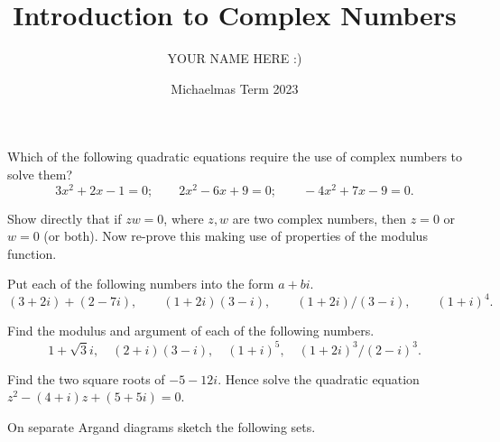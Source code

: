 \documentclass[answers]{exam}
\title{Introduction to Complex Numbers}
\author{YOUR NAME HERE :)}
\date{Michaelmas Term 2023}
\begin{document}
\maketitle
\begin{questions}

\question%
Which of the following quadratic equations require the use of complex numbers to solve them? \[
	3 x^{2}+2 x-1=0 ; \qquad 2 x^{2}-6 x+9=0 ; \qquad-4 x^{2}+7 x-9=0.
\]



\question%
Show directly that if $z w=0$, where $z, w$ are two complex numbers, then $z=0$ or $w=0$ (or both). Now re-prove this making use of properties of the modulus function.



\question%
Put each of the following numbers into the form $a+b i$. \[
	(3+2 i)+(2-7 i), \qquad(1+2 i)(3-i), \qquad(1+2 i) /(3-i), \qquad(1+i)^{4}.
\]



\question%
Find the modulus and argument of each of the following numbers. \[
	1+\sqrt{3} i, \quad(2+i)(3-i), \quad(1+i)^{5}, \quad(1+2 i)^{3} /(2-i)^{3}.
\]



\question%
Find the two square roots of $-5-12 i$. Hence solve the quadratic equation $z^{2}-(4+i) z+(5+5 i)=0$.



\question%
On separate Argand diagrams sketch the following sets.
\end{questions}
\end{document}
